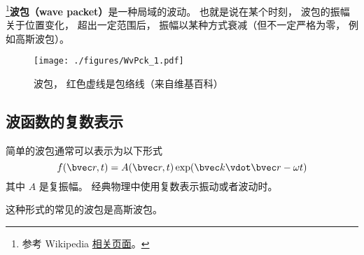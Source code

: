 

\footnote{参考 Wikipedia \href{https://en.wikipedia.org/wiki/Wave_packet}{相关页面}。}\textbf{波包（wave packet）}是一种局域的波动。 也就是说在某个时刻， 波包的振幅关于位置变化， 超出一定范围后， 振幅以某种方式衰减（但不一定严格为零， 例如高斯波包）。

\begin{figure}[ht]
\centering
\texttt{[image: ./figures/WvPck\_1.pdf]}
\caption{波包， 红色虚线是包络线（来自维基百科）} \label{WvPck_fig1}
\end{figure}

\subsection{波函数的复数表示}
简单的波包通常可以表示为以下形式
\begin{equation}
f(\bvec r, t) = A(\bvec r, t) \exp(\bvec k \vdot \bvec r - \omega t)
\end{equation}
其中 $A$ 是复振幅。 经典物理中使用复数表示振动或者波动时。

这种形式的常见的波包是高斯波包。
